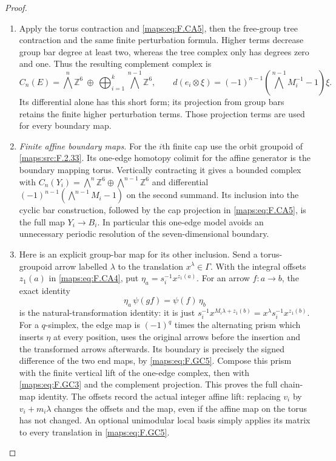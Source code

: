 \documentclass[11pt,a4paper]{article}
\theoremstyle{definition}
\begin{document}
\begin{proof}
\begin{enumerate}[label=\arabic*.]
\item Apply the torus contraction and \eqref{maps:eq:F.CA5}, then the free-group
tree contraction and the same finite perturbation formula.
Higher terms decrease group bar degree at least two, whereas
the tree complex only has degrees zero and one.  Thus the
resulting complement complex is
\[
 C_n(E)=\bigwedge^n\mathbb Z^6\ \oplus\
 \bigoplus_{i=1}^k\bigwedge^{n-1}\mathbb Z^6,
 \qquad
 d(e_i\otimes\xi)=(-1)^{n-1}
   (\bigwedge^{n-1}M_i^{-1}-1)\xi.                         \tag{F.GC4}\label{maps:eq:F.GC4}
\]
Its differential alone has this short form; its projection
from group bars retains the finite higher perturbation terms.
Those projection terms are used for every boundary map.

\item \emph{Finite affine boundary maps.}
For the $i$th finite cap use the orbit groupoid of \ref{maps:src:F.2.33}.
Its one-edge homotopy colimit for the affine generator is
the boundary mapping torus.  Vertically contracting it gives
a bounded complex with
$C_n(Y_i)=\bigwedge^n\mathbb Z^6\oplus
\bigwedge^{n-1}\mathbb Z^6$ and differential
$(-1)^{n-1}(\bigwedge^{n-1}M_i-1)$ on the second summand.
Its inclusion into the cyclic bar construction, followed by
the cap projection in \eqref{maps:eq:F.CA5}, is the full map $Y_i\to B_i$.
In particular this one-edge model avoids an unnecessary
periodic resolution of the seven-dimensional boundary.

\item Here is an explicit group-bar map for its other inclusion.
Send a torus-groupoid arrow labelled $\lambda$ to the
translation $x^\lambda\in\Gamma$.  With the integral offsets
$z_1(a)$ in \eqref{maps:eq:F.CA4}, put
$\eta_a=s_i^{-1}x^{z_1(a)}$.
For an arrow $f:a\to b$, the exact identity
\[
 \eta_a\,\psi(gf)=\psi(f)\,\eta_b                        \tag{F.GC5}\label{maps:eq:F.GC5}
\]
is the natural-transformation identity: it is just
$s_i^{-1}x^{M_i\lambda+z_1(b)}
 =x^\lambda s_i^{-1}x^{z_1(b)}$.
For a $q$-simplex, the edge map is $(-1)^q$ times the
alternating prism which inserts $\eta$ at every position,
uses the original arrows before the insertion and the
transformed arrows afterwards.  Its boundary is precisely
the signed difference of the two end maps, by \eqref{maps:eq:F.GC5}.
Compose this prism with the finite vertical lift of the
one-edge complex, then with \eqref{maps:eq:F.GC3} and the complement
projection.  This proves the full chain-map identity.
The offsets record the actual integer affine lift: replacing
$v_i$ by $v_i+m_i\lambda$ changes the offsets and the map,
even if the affine map on the torus has not changed.
An optional unimodular local basis simply applies its matrix
to every translation in \eqref{maps:eq:F.GC5}.


\end{enumerate}
\end{proof}
\end{document}
